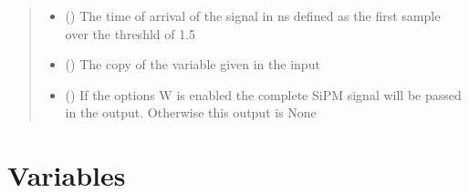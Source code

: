\documentclass[letterpaper,10pt,english]{sphinxmanual}
\begin{document}
\begin{fulllineitems}
\begin{quote}
\begin{description}
\begin{itemize}
\item {} 
 () \textendash{} The time of arrival of the signal in ns defined as the first sample over the threshld of 1.5

\item {} 
 () \textendash{} The copy of the  variable given in the input

\item {} 
 () \textendash{} If the options \sphinxhyphen{}W is enabled the complete SiPM signal will be passed in the output. Otherwise this output is None

\end{itemize}


\end{description}\end{quote}

\end{fulllineitems}



\section{Variables}
\label{\detokenize{structure:variables}}
\end{document}

